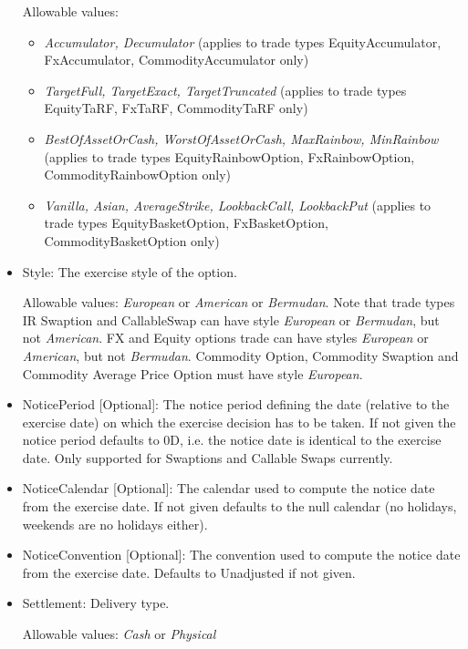 \begin{itemize}
  Allowable values:
  \begin{itemize}
  \item \emph{Accumulator, Decumulator} (applies to trade types EquityAccumulator, FxAccumulator, CommodityAccumulator only)
  \item \emph{TargetFull, TargetExact, TargetTruncated} (applies to trade types EquityTaRF, FxTaRF, CommodityTaRF only)
  \item \emph{BestOfAssetOrCash, WorstOfAssetOrCash, MaxRainbow, MinRainbow} (applies to trade types EquityRainbowOption,
    FxRainbowOption, CommodityRainbowOption only)
  \item \emph{Vanilla, Asian, AverageStrike, LookbackCall, LookbackPut} (applies to trade types EquityBasketOption,
    FxBasketOption, CommodityBasketOption only)
  \end{itemize}

\item Style: The exercise style of the option. 

  Allowable values: \emph{European} or \emph{American} or \emph{Bermudan}. Note that trade types IR Swaption and CallableSwap can have style
  \emph{European} or \emph{Bermudan}, but not \emph{American}.  FX and Equity options trade can have styles \emph{European}
  or \emph{American}, but not \emph{Bermudan}. Commodity Option, Commodity Swaption and Commodity Average Price Option must have style  \emph{European}. 

\item NoticePeriod [Optional]: The notice period defining the date (relative to the exercise date) on which the exercise
  decision has to be taken. If not given the notice period defaults to 0D, i.e. the notice date is identical to the
  exercise date. Only supported for Swaptions and Callable Swaps currently.

\item NoticeCalendar [Optional]: The calendar used to compute the notice date from the exercise date. If not given
  defaults to the null calendar (no holidays, weekends are no holidays either).

\item NoticeConvention [Optional]: The convention used to compute the notice date from the exercise date. Defaults to
  Unadjusted if not given.

\item Settlement: Delivery type. 

  Allowable values: \emph{Cash} or \emph{Physical}


\end{itemize}
